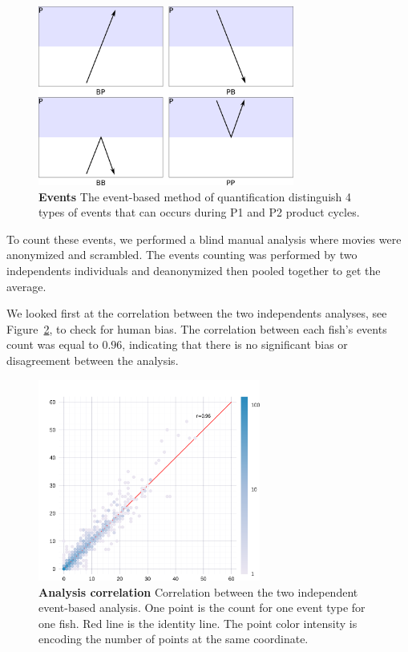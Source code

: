     \begin{figure}[htb]
      \centering
      \includegraphics[width=0.75\textwidth]{part_2/assets/events.png}
      \caption{\textbf{Events} The event-based method of quantification distinguish 4 types of events that can occurs during P1 and P2 product cycles.}
      \label{events}
    \end{figure}

  To count these events, we performed a blind manual analysis where movies were anonymized and scrambled. The events counting was performed by two independents individuals and deanonymized then pooled together to get the average.

  We looked first at the correlation between the two independents analyses, see Figure~\ref{correlation_count}, to check for human bias. The correlation between each fish's events count was equal to $0.96$, indicating that there is no significant bias or disagreement between the analysis.

    \begin{figure}[htb]
      \centering
      \includegraphics[width=0.65\textwidth]{part_2/assets/correlation.png}
      \caption{\textbf{Analysis correlation} Correlation between the two independent event-based analysis. One point is the count for one event type for one fish. Red line is the identity line. The point color intensity is encoding the number of points at the same coordinate.}
      \label{correlation_count}
    \end{figure}

